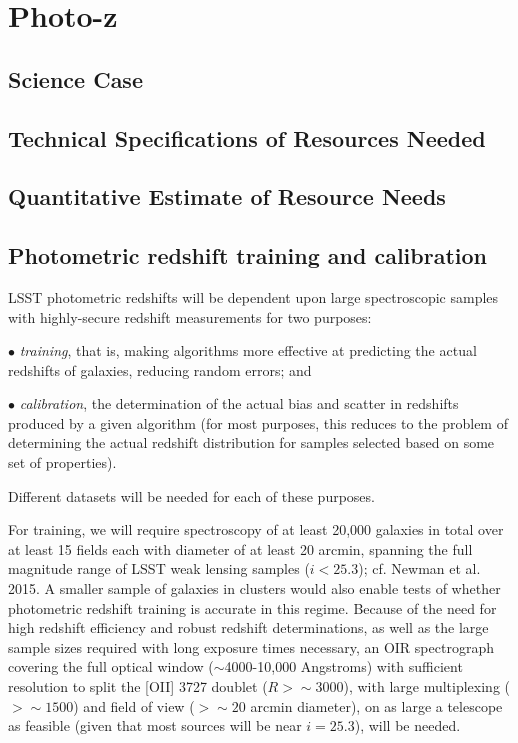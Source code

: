 
\section{Photo-z}
\label{sec:photoz}

\subsection{Science Case}

\subsection{Technical Specifications of Resources Needed}

\subsection{Quantitative Estimate of Resource Needs}

\subsection{Photometric redshift training and calibration}\label{subsec:training}

LSST photometric redshifts will be dependent upon large spectroscopic samples with highly-secure redshift measurements for two purposes: 

$\bullet$ {\it training}, that is, making algorithms more effective at predicting the actual redshifts of galaxies, reducing random errors; and 

$\bullet$ {\it calibration}, the determination of the actual bias and scatter in redshifts produced by a given algorithm (for most purposes, this reduces to the problem of determining the actual redshift distribution for samples selected based on some set of properties).  

Different datasets will be needed for each of these purposes.

For training, we will require spectroscopy of at least 20,000 galaxies in total over at least 15 fields each with diameter of at least 20 arcmin, spanning the full magnitude range of LSST weak lensing samples ($i<25.3$); cf. Newman et al. 2015.  A smaller sample of galaxies in clusters would also enable tests of whether photometric redshift training is accurate in this regime.  Because of the need for high redshift efficiency and robust redshift determinations, as well as the large sample sizes required with long exposure times necessary, an OIR spectrograph covering the full optical window ($\sim$4000-10,000 Angstroms) with sufficient resolution to split the [OII] 3727 doublet ($R>\sim 3000$), with large multiplexing ($>\sim 1500$) and field of view ($>\sim 20$ arcmin diameter), on as large a telescope as feasible (given that most sources will be near $i=25.3$), will be needed.  

